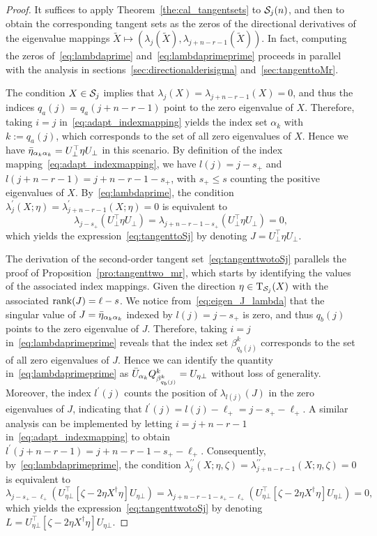 \begin{proof}
It suffices to apply Theorem~\ref{the:cal_tangentsets} to $\mathcal{S}_j(n)$, and then to obtain the corresponding tangent sets as the zeros of the directional derivatives of the eigenvalue mappings $\tilde{X}\mapsto(\lambda_{j}(\tilde{X}),\lambda_{j+n-r-1}(\tilde{X}))$. In fact, computing the zeros of~\eqref{eq:lambdaprime} and~\eqref{eq:lambdaprimeprime} proceeds in parallel with the analysis in sections~\ref{sec:directionalderisigma} and~\ref{sec:tangenttoMr}.

The condition $X\in\mathcal{S}_j$ implies that $\lambda_{j}({X})=\lambda_{j+n-r-1}({X})=0$, and thus the indices $q_a(j)=q_a(j+n-r-1)$ point to the zero eigenvalue of $X$. Therefore, taking $i=j$ in~\eqref{eq:adapt_indexmapping} yields the index set $\alpha_k$ with $k:=q_a(j)$, which corresponds to the set of all zero eigenvalues of $X$. Hence we have $\bar{\eta}_{\alpha_k\alpha_k}=U_\bot^\top \eta U_\bot$ in this scenario. By definition of the index mapping~\eqref{eq:adapt_indexmapping}, we have $l(j)=j-s_+$ and $l(j+n-r-1)=j+n-r-1-s_+$, with $s_+\le s$ counting the positive eigenvalues of $X$. By~\eqref{eq:lambdaprime}, the condition $\lambda^\prime_{j}(X;\eta)=\lambda_{j+n-r-1}^\prime(X;\eta)=0$ is equivalent to
\begin{equation}\label{eq:eigen_J_lambda}
    \lambda_{j-s_+}(U_\bot^\top\eta U_\bot) = \lambda_{j+n-r-1-s_+}(U_\bot^\top\eta U_\bot) = 0,
\end{equation}
which yields the expression~\eqref{eq:tangenttoSj} by denoting $J=U_\bot^\top\eta U_\bot$.

The derivation of the second-order tangent set~\eqref{eq:tangenttwotoSj} parallels the proof of Proposition~\ref{pro:tangenttwo_mr}, which starts by identifying the values of the associated index mappings. Given the direction $\eta\in\mathrm{T}_{\mathcal{S}_j}(X)$ with the associated $\operatorname{rank}(J)=\ell-s$. We notice from~\eqref{eq:eigen_J_lambda} that the singular value of $J=\bar{\eta}_{\alpha_k\alpha_k}$ indexed by $l(j)=j-s_+$ is zero, and thus $q_b(j)$ points to the zero eigenvalue of $J$. Therefore, taking $i=j$ in~\eqref{eq:lambdaprimeprime} reveals that the index set $\beta_{q_b(j)}^k$ corresponds to the set of all zero eigenvalues of $J$. Hence we can identify the quantity in~\eqref{eq:lambdaprimeprime} as $\bar{U}_{\alpha_k} Q^k_{\beta^k_{q_b(j)}}=U_{\eta\bot}$ without loss of generality. Moreover, the index $l^\prime(j)$ counts the position of $\lambda_{l(j)}(J)$ in the zero eigenvalues of $J$, indicating that $l^\prime(j)=l(j)-\ell_+=j-s_+-\ell_+$. A similar analysis can be implemented by letting $i=j+n-r-1$ in~\eqref{eq:adapt_indexmapping} to obtain $l^\prime(j+n-r-1)=j+n-r-1-s_+-\ell_+$. Consequently, by~\eqref{eq:lambdaprimeprime}, the condition $\lambda^{\prime\prime}_{j}(X;\eta,\zeta)=\lambda^{\prime\prime}_{j+n-r-1}(X;\eta,\zeta)=0$ is equivalent to
\begin{equation*}
    \lambda_{j-s_+-\ell_+}(U_{\eta\bot}^\top[\zeta-2\eta X^\dagger\eta]U_{\eta\bot}) = \lambda_{j+n-r-1-s_+-\ell_+}(U_{\eta\bot}^\top[\zeta-2\eta X^\dagger\eta]U_{\eta\bot}) = 0,
\end{equation*}
which yields the expression~\eqref{eq:tangenttwotoSj} by denoting $L=U_{\eta\bot}^\top[\zeta-2\eta X^\dagger\eta]U_{\eta\bot}$.


\end{proof}
